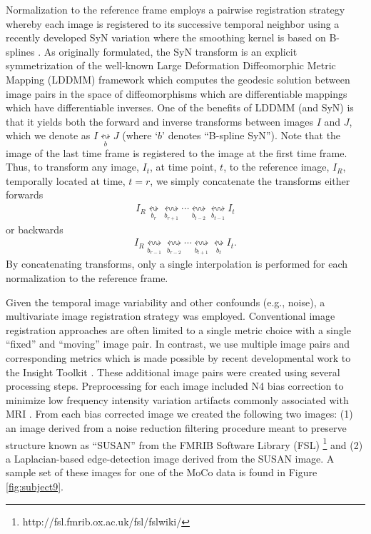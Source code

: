 \documentclass{llncs}
\begin{document}
Normalization to the reference frame employs a pairwise registration strategy
whereby each image is registered to its successive temporal neighbor using 
a recently developed SyN variation where the smoothing kernel is based on 
B-splines \cite{tustison2013}.  As originally formulated, the SyN transform
is an explicit symmetrization of the well-known Large Deformation Diffeomorphic 
Metric Mapping (LDDMM) framework \cite{beg2005} which computes the geodesic 
solution between image pairs in the space of diffeomorphisms \cite{dupuis1998}
which are differentiable mappings which have differentiable inverses.
One of the benefits of LDDMM (and SyN) is that it yields both 
the forward and inverse transforms between images $I$ and $J$, which we denote
as $I \underset{b}{\leftrightsquigarrow} J$ (where `$b$' denotes ``B-spline SyN'').
Note that the image of the last time frame is registered to the image at the 
first time frame.  Thus, to transform any image, $I_t$, at time point, $t$, to the 
reference image, $I_R$, temporally located at time, $t=r$, we simply concatenate 
the transforms either forwards
\begin{align}
I_R  \underset{b_r}{\leftrightsquigarrow} \underset{b_{r+1}}{\leftrightsquigarrow} \cdots
      \underset{b_{t-2}}{\leftrightsquigarrow}\underset{b_{t-1}}{\leftrightsquigarrow} I_t
\end{align}
or backwards
\begin{align}
I_R  \underset{b_{r-1}}{\leftrightsquigarrow} \underset{b_{r-2}}{\leftrightsquigarrow} \cdots
      \underset{b_{t+1}}{\leftrightsquigarrow}\underset{b_t}{\leftrightsquigarrow} I_t.
\end{align}
By concatenating transforms, only a single
interpolation is performed for each normalization to the reference frame.  

Given the temporal image variability and other confounds (e.g., noise), 
a multivariate image registration strategy was employed.  Conventional
image registration approaches are often limited to a single metric choice
with a single ``fixed'' and ``moving'' image pair.  In contrast, we 
use multiple image
pairs and corresponding metrics which is made possible by recent 
developmental work to the Insight Toolkit \cite{avants2014}.  
These additional image pairs were created using several processing steps.
Preprocessing for each image included N4 bias correction to minimize low frequency
intensity variation artifacts commonly associated with MRI \cite{tustison2010}.  From each
bias corrected image we created the following two images:  (1) an image derived
from a noise reduction filtering procedure meant to preserve structure 
\cite{smith1997} known as ``SUSAN'' from the FMRIB Software Library (FSL)%
\footnote{
http://fsl.fmrib.ox.ac.uk/fsl/fslwiki/
}
and (2) a Laplacian-based edge-detection image
derived from the SUSAN image.  A sample set of these images for one of the MoCo
data is found in Figure \ref{fig:subject9}.
\end{document}
